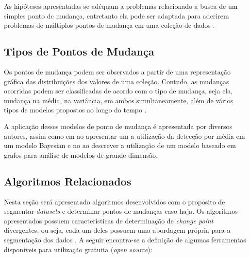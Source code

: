 As hipóteses apresentadas se adéquam a problemas relacionado a busca de um simples ponto de mudança, entretanto ela pode ser adaptada para aderirem problemas de múltiplos pontos de mudança em uma coleção de dados \cite{Chen1-2000}.

\subsection{Tipos de Pontos de Mudança}

Os pontos de mudança podem ser observados a partir de uma representação gráfica das distribuições dos valores de uma coleção. Contudo, as mudanças ocorridas podem ser classificadas de acordo com o tipo de mudança, seja ela, mudança na média, na variância, em ambos simultaneamente, além de vários tipos de modelos propostos ao longo do tempo \cite{Chen2-2000}. 

A aplicação desses modelos de ponto de mudança é apresentada por diversos autores, assim como em \cite{Cheon2010} ao apresentar um a utilização da detecção por média em um modelo Bayesian e no \cite{Shi2017} ao descrever a utilização de um modelo baseado em grafos para análise de modelos de grande dimensão.





\subsection{Algoritmos Relacionados}

Nesta seção será apresentado algoritmos desenvolvidos com o proposito de segmentar \textit{datasets} e determinar pontos de mudanças caso haja. Os algoritmos apresentados possuem características de determinação de \textit{change point} divergentes, ou seja, cada um deles possuem uma abordagem própria para a segmentação dos dados \cite{Aminikhanghahi2017}. A seguir encontra-se a definição de algumas ferramentas disponíveis para utilização gratuita (\textit{open source}):

